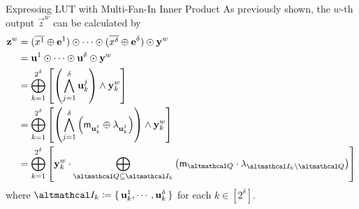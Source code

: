 \documentclass[../240906_cryptlab_flute.tex]{subfiles}
\begin{document}
\begin{frame}{Expressing LUT with Multi-Fan-In Inner Product}
    As previously shown, the \(w\)-th output \(\vec{z}^w\) can be calculated by
    \begin{align*}
        \vec{z}^w
        &= (\ol{x^1} \oplus \vec{e}^1) \odot \cdots \odot (\ol{x^\delta} \oplus \vec{e}^\delta) \odot \vec{y}^w \\
        &= \vec{u}^1 \odot \cdots \odot \vec{u}^\delta \odot \vec{y}^w \\
        &= \bigoplus_{k=1}^{2^\delta} \left[ \left(\bigwedge_{j=1}^\delta \vec{u}^j_k\right) \wedge \vec{y}^w_k \right] \\
        &= \bigoplus_{k=1}^{2^\delta} \left[
            \left(\bigwedge_{j=1}^\delta \left( \msf{m}_{\vec{u}^j_k} \oplus \lambda_{\vec{u}^j_k} \right) \right)
            \wedge \vec{y}^w_k \right] \\
        &= \bigoplus_{k=1}^{2^\delta} \left[\vec{y}^w_k \cdot \bigoplus_{\mcal{Q} \subseteq \mcal{I}_k}
            \big(\msf{m}_{\mcal{Q}} \cdot \lambda_{\mcal{I}_k \setminus \mcal{Q}} \big)\right]
    \end{align*}
    where \(\mcal{I}_k \coloneqq \{\,\vec{u}^1_k, \cdots, \vec{u}^\delta_k\,\}\)
    for each \(k \in [2^\delta]\).
\end{frame}
\end{document}
